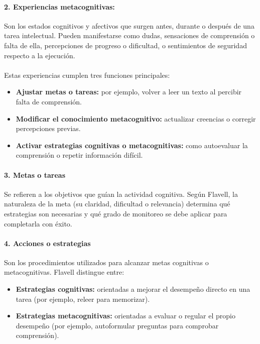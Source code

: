 \paragraph{2. Experiencias metacognitivas:}
Son los estados cognitivos y afectivos que surgen antes, durante o después de una tarea intelectual. Pueden manifestarse como dudas, sensaciones de comprensión o falta de ella, percepciones de progreso o dificultad, o sentimientos de seguridad respecto a la ejecución.
\\
\\
Estas experiencias cumplen tres funciones principales:

\begin{itemize}
    \item \textbf{Ajustar metas o tareas:} por ejemplo, volver a leer un texto al percibir falta de comprensión.
    \item \textbf{Modificar el conocimiento metacognitivo:} actualizar creencias o corregir percepciones previas.
    \item \textbf{Activar estrategias cognitivas o metacognitivas:} como autoevaluar la comprensión o repetir información difícil.
\end{itemize}

\paragraph{3. Metas o tareas}

Se refieren a los objetivos que guían la actividad cognitiva. Según Flavell, la naturaleza de la meta (su claridad, dificultad o relevancia) determina qué estrategias son necesarias y qué grado de monitoreo se debe aplicar para completarla con éxito.

\paragraph{4. Acciones o estrategias}

Son los procedimientos utilizados para alcanzar metas cognitivas o metacognitivas. Flavell distingue entre:

\begin{itemize}
    \item \textbf{Estrategias cognitivas:} orientadas a mejorar el desempeño directo en una tarea (por ejemplo, releer para memorizar).
    \item \textbf{Estrategias metacognitivas:} orientadas a evaluar o regular el propio desempeño (por ejemplo, autoformular preguntas para comprobar comprensión).
\end{itemize}


